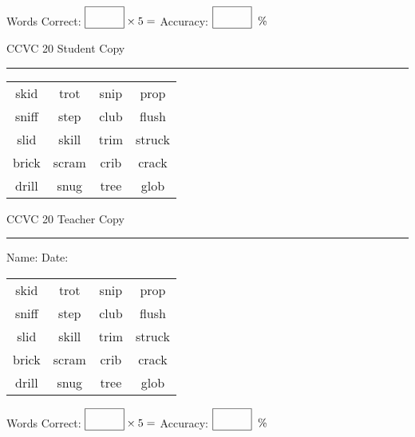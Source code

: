 \documentclass{memoir}
\begin{document}
\small

Words Correct: $\fbox{\phantom{\huge 100}} \times 5 = $ Accuracy: $\fbox{\phantom{\huge 100}}\;\; \%$ 

\vfill

\newpage



\footnotesize \noindent
CCVC 20 \hfill Student Copy
\smallskip
\hrule

\Large

\setlength{\tabcolsep}{14pt}
\def\arraystretch{3}

{\selectfont


\begin{vplace}[0.5]
\begin{center}
\begin{tabular}{cccc}
skid & trot & snip & prop \\
sniff & step & club & flush \\
slid & skill & trim & struck \\
brick       & scram & crib & crack       \\
drill & snug & tree & glob \\
\end{tabular}
\end{center}
\end{vplace}

}

\newpage

\footnotesize \noindent
CCVC 20 \hfill Teacher Copy
\smallskip
\hrule

\small

\vfill

\noindent
Name: \underline{\hspace{1.75in}} \hfill Date: \underline{\hspace{1in}}

\Large

{\selectfont


\begin{vplace}[0.5]
\begin{center}
\begin{tabular}{cccc}
skid & trot & snip & prop \\
sniff & step & club & flush \\
slid & skill & trim & struck \\
brick       & scram & crib & crack       \\
drill & snug & tree & glob \\
\end{tabular}
\end{center}
\end{vplace}



}

\small

Words Correct: $\fbox{\phantom{\huge 100}} \times 5 = $ Accuracy: $\fbox{\phantom{\huge 100}}\;\; \%$ 

\vfill

\end{document}
